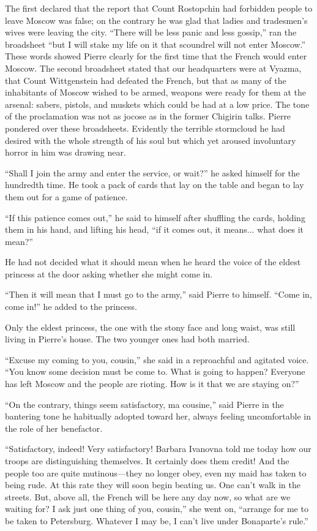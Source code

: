 The first declared that the report that Count Rostopchin had
forbidden people to leave Moscow was false; on the contrary he
was glad that ladies and tradesmen's wives were leaving the
city. ``There will be less panic and less gossip,'' ran the
broadsheet ``but I will stake my life on it that scoundrel will
not enter Moscow.'' These words showed Pierre clearly for the
first time that the French would enter Moscow. The second
broadsheet stated that our headquarters were at Vyazma, that
Count Wittgenstein had defeated the French, but that as many of
the inhabitants of Moscow wished to be armed, weapons were ready
for them at the arsenal: sabers, pistols, and muskets which could
be had at a low price. The tone of the proclamation was not as
jocose as in the former Chigirin talks. Pierre pondered over
these broadsheets. Evidently the terrible stormcloud he had
desired with the whole strength of his soul but which yet aroused
involuntary horror in him was drawing near.

``Shall I join the army and enter the service, or wait?'' he
asked himself for the hundredth time. He took a pack of cards
that lay on the table and began to lay them out for a game of
patience.

``If this patience comes out,'' he said to himself after
shuffling the cards, holding them in his hand, and lifting his
head, ``if it comes out, it means... what does it mean?''

He had not decided what it should mean when he heard the voice of
the eldest princess at the door asking whether she might come in.

``Then it will mean that I must go to the army,'' said Pierre to
himself.  ``Come in, come in!'' he added to the princess.

Only the eldest princess, the one with the stony face and long
waist, was still living in Pierre's house. The two younger ones
had both married.

``Excuse my coming to you, cousin,'' she said in a reproachful
and agitated voice. ``You know some decision must be come
to. What is going to happen? Everyone has left Moscow and the
people are rioting. How is it that we are staying on?''

``On the contrary, things seem satisfactory, ma cousine,'' said
Pierre in the bantering tone he habitually adopted toward her,
always feeling uncomfortable in the role of her benefactor.

``Satisfactory, indeed! Very satisfactory! Barbara Ivanovna told
me today how our troops are distinguishing themselves. It
certainly does them credit! And the people too are quite
mutinous---they no longer obey, even my maid has taken to being
rude. At this rate they will soon begin beating us. One can't
walk in the streets. But, above all, the French will be here any
day now, so what are we waiting for? I ask just one thing of you,
cousin,'' she went on, ``arrange for me to be taken to
Petersburg. Whatever I may be, I can't live under Bonaparte's
rule.''

